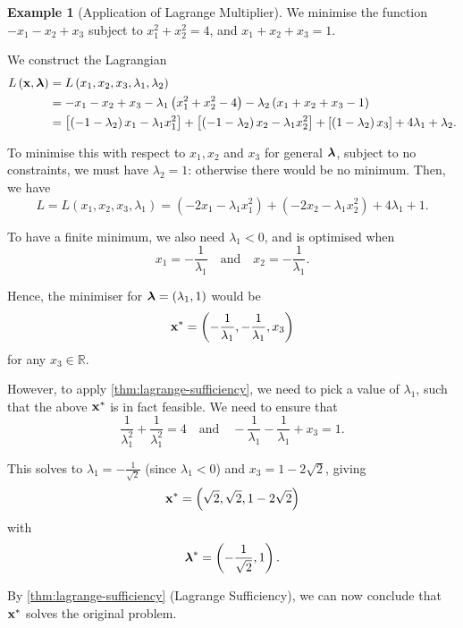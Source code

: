 \documentclass[11pt]{article}
\theoremstyle{definition}
\newtheorem{example}[theorem]{Example}
\theoremstyle{remark}
\newcommand{\pqty}[1]{\left(#1\right)}
\newcommand{\bqty}[1]{\left[#1\right]}
\newcommand{\flatfrac}[2]{\frac{#1}{#2}}
\newcommand{\RR}{\mathbb{R}}
\newcommand{\qand}{\quad\text{and}\quad}
\begin{document}
\begin{example}[Application of Lagrange Multiplier]\label{optim-unit-0026}
    We minimise the function \(- x_1 - x_2 + x_3\) subject to \(x_1^2 + x_2^2 = 4\), and \(x_1 + x_2 + x_3 = 1\).

    We construct the Lagrangian
    \begin{align*}
        L \pqty{\vb{x}, \vb*{\lambda}} &= L\pqty{x_1, x_2, x_3, \lambda_1, \lambda_2} \\
        &= - x_1 - x_2 + x_3 - \lambda_1 \pqty{x_1^2 + x_2^2 - 4} - \lambda_2 \pqty{x_1 + x_2 + x_3 - 1} \\
        &= \bqty{\pqty{-1 - \lambda_2} x_1 - \lambda_1 x_1^2} + \bqty{\pqty{-1 - \lambda_2} x_2 - \lambda_1 x_2^2} + \bqty{\pqty{1 - \lambda_2} x_3} + 4 \lambda_1 + \lambda_2.
    \end{align*}

    To minimise this with respect to \(x_1, x_2\) and \(x_3\) for general \(\vb*{\lambda}\), subject to no constraints, we must have \(\lambda_2 = 1\): otherwise there would be no minimum. Then, we have
    \[
        L = L\pqty{x_1, x_2, x_3, \lambda_1} = \pqty{-2 x_1 - \lambda_1 x_1^2} + \pqty{-2 x_2 - \lambda_1 x_2^2} + 4 \lambda_1 + 1.
    \]

    To have a finite minimum, we also need \(\lambda_1 < 0\), and is optimised when
    \[
        x_1 = - \frac{1}{\lambda_1} \qand x_2 = - \frac{1}{\lambda_1}.
    \]

    Hence, the minimiser for \(\vb*{\lambda} = \pqty{\lambda_1, 1}\) would be
    \[
        \vb{x}^{\ast} = \pqty{- \frac{1}{\lambda_1}, - \frac{1}{\lambda_1}, x_3}
    \]
    for any \(x_3 \in \RR\).
    
    However, to apply \autoref{thm:lagrange-sufficiency}, we need to pick a value of \(\lambda_1\), such that the above \(\vb{x}^{\ast}\) is in fact feasible. We need to ensure that
    \[
        \frac{1}{\lambda_1^2} + \frac{1}{\lambda_1^2} = 4 \qand - \frac{1}{\lambda_1} - \frac{1}{\lambda_1} + x_3 = 1.
    \]

    This solves to \(\lambda_1 = - \flatfrac{1}{\sqrt{2}}\) (since \(\lambda_1 < 0\)) and \(x_3 = 1 - 2 \sqrt{2}\), giving
    \[
        \vb{x}^{\ast} = \pqty{\sqrt{2}, \sqrt{2}, 1 - 2 \sqrt{2}}
    \]
    with
    \[
        \vb*{\lambda}^{\ast} = \pqty{- \frac{1}{\sqrt{2}}, 1}.
    \]

    By \autoref{thm:lagrange-sufficiency} (Lagrange Sufficiency), we can now conclude that \(\vb{x}^{\ast}\) solves the original problem.
\end{example}
\end{document}
